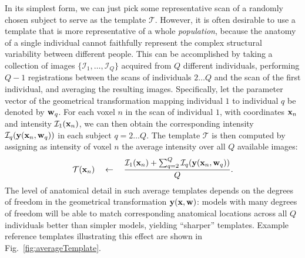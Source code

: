 \documentclass[10pt,twoside]{book}
\begin{document}
In its simplest form, we can just pick some representative scan of a randomly chosen subject to serve as the template $\mathcal{T}$. 
However, it is often desirable to use a template that is more representative of a whole \emph{population}, 
because the anatomy of a single individual cannot faithfully represent the complex structural variability between different people.
This can be accomplished by taking a collection of images $\{ \mathcal{I}_1, \ldots, \mathcal{I}_Q \}$ acquired from $Q$
different individuals, performing $Q-1$ registrations between the scans of individuals $2 \ldots Q$ and the scan of the first
individual, and averaging the resulting images. Specifically, let the parameter vector of the geometrical transformation mapping 
individual $1$ to individual $q$ be denoted
by $\mathbf{w}_q$. For each voxel $n$ in the scan of individual $1$, with coordinates $\mathbf{x}_n$ and intensity $\mathcal{I}_1( \mathbf{x}_n)$, 
we can then obtain the corresponding intensity $\mathcal{I}_q( \mathbf{y}(\mathbf{x}_n, \mathbf{w}_q ) )$ in each subject $q = 2 \ldots Q$.
The template $\mathcal{T}$ is then computed by assigning as intensity of voxel $n$ the average intensity over all $Q$ available images:
\begin{displaymath}
  \mathcal{T}( \mathbf{x}_n ) \quad \gets \quad \frac{\mathcal{I}_1( \mathbf{x}_n) + \sum_{q=2}^Q \mathcal{I}_q( \mathbf{y}(\mathbf{x}_n, \mathbf{w}_q ) ) }{Q}.
\end{displaymath}
The level of anatomical detail in such average templates depends on the degrees of freedom in the geometrical transformation $\mathbf{y}(\mathbf{x},\mathbf{w})$:
models with many degrees of freedom will be able to match corresponding anatomical locations across all $Q$ individuals better than simpler models, 
yielding ``sharper'' templates. Example reference templates illustrating this effect are shown in Fig.~\ref{fig:averageTemplate}. 
\end{document}
